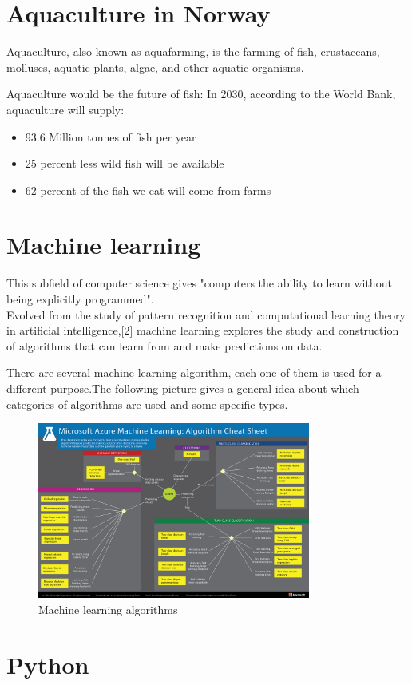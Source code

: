 \section{Aquaculture in Norway}
Aquaculture, also known as aquafarming, is the farming of fish, crustaceans, molluscs, aquatic plants, algae, and other aquatic organisms.

Aquaculture would be the future of fish:
In 2030, according to the World Bank, aquaculture will supply:
\begin{itemize}
\item 93.6 Million tonnes of fish per year
\item 25 percent less wild fish will be available
\item 62 percent of the fish we eat will come from farms
\end{itemize}


\section{Machine learning}
This subfield of computer science gives "computers the ability to learn without being explicitly programmed". \\Evolved from the study of pattern recognition and computational learning theory in artificial intelligence,[2] machine learning explores the study and construction of algorithms that can learn from and make predictions on data.

There are several machine learning algorithm, each one of them is used for a different purpose.The following picture gives a general idea about which categories of algorithms are used and some specific types.
\begin{figure}[h]
    \centering
    \includegraphics[trim=0cm 0cm 0cm 0cm, clip=true, width=0.8\textwidth,natwidth=610,natheight=642]{Files/Machine_Learning.png}
    \caption[Machine learning algorithms]{Machine learning algorithms}
    \label{fig: Machine_Learning}
\end{figure}



\section{Python}


